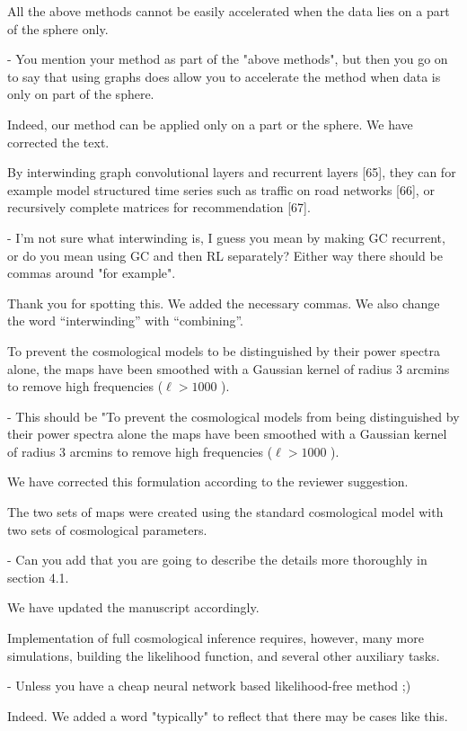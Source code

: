 \documentclass[12pt,a4paper]{article}
\newcommand{\1}{\b{1}}              %
\newcommand{\0}{\b{0}}              %
\begin{document}
\begin{mdframed}[style=comment]
All the above methods cannot be easily accelerated when the data lies on a part of the sphere only.

- You mention your method as part of the "above methods", but then you go on to say that using graphs does allow you to accelerate the method when data is only on part of the sphere.
\end{mdframed}
Indeed, our method can be applied only on a part or the sphere. We have corrected the text.

\begin{mdframed}[style=comment]
By interwinding graph convolutional layers and recurrent layers [65], they can for example model structured time series such as traffic on road networks [66], or recursively complete matrices for recommendation [67].

- I'm not sure what interwinding is, I guess you mean by making GC recurrent, or do you mean using GC and then RL separately? Either way there should be commas around "for example".
\end{mdframed}
Thank you for spotting this. We added the necessary commas. We also change the word ``interwinding'' with ``combining''.


\begin{mdframed}[style=comment]
To prevent the cosmological models to be distinguished by their power spectra alone, the maps have been smoothed with a Gaussian kernel of radius 3 arcmins to remove high frequencies ($\ell> 1000$ ).

- This should be "To prevent the cosmological models from being distinguished by their power spectra alone the maps have been smoothed with a Gaussian kernel of radius 3 arcmins to remove high frequencies ($\ell> 1000$ ).
\end{mdframed}
We have corrected this formulation according to the reviewer suggestion.

\begin{mdframed}[style=comment]
The two sets of maps were created using the standard cosmological model with two sets of cosmological parameters.

- Can you add that you are going to describe the details more thoroughly in section 4.1.
\end{mdframed}
We have updated the manuscript accordingly.

\begin{mdframed}[style=comment]
Implementation of full cosmological inference requires, however, many more simulations, building the likelihood function, and several other auxiliary tasks.

- Unless you have a cheap neural network based likelihood-free method ;)
\end{mdframed}
Indeed. We added a word "typically" to reflect that there may be cases like this.
\end{document}
